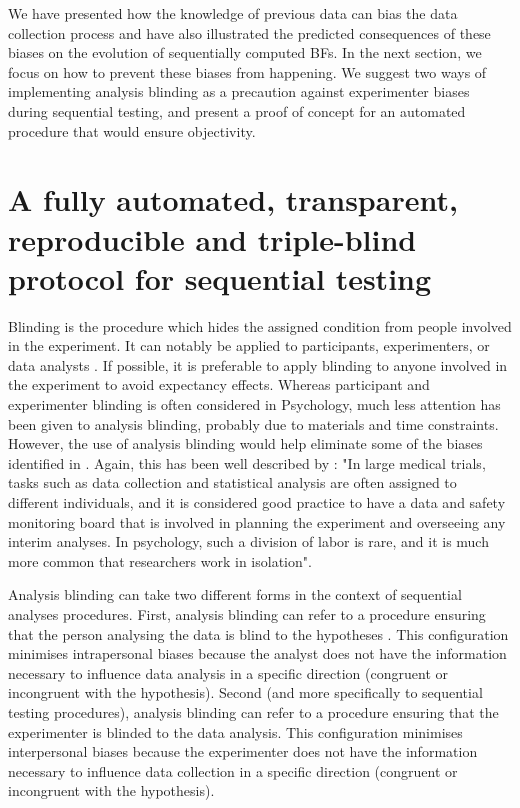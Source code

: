 \documentclass[a4paper,jou,natbib,floatsintext,donotrepeattitle]{apa6}
\begin{document}

We have presented how the knowledge of previous data can bias the data collection process and have also illustrated the predicted consequences of these biases on the evolution of sequentially computed BFs. In the next section, we focus on how to prevent these biases from happening. We suggest two ways of implementing analysis blinding as a precaution against experimenter biases during sequential testing, and present a proof of concept for an automated procedure that would ensure objectivity.

\section{A fully automated, transparent, reproducible and triple-blind protocol for sequential testing}

Blinding is the procedure which hides the assigned condition from people involved in the experiment. It can notably be applied to participants, experimenters, or data analysts \citep{schulz_blinding_2002}. If possible, it is preferable to apply blinding to anyone involved in the experiment to avoid expectancy effects. Whereas participant and experimenter blinding is often considered in Psychology, much less attention has been given to analysis blinding, probably due to materials and time constraints. However, the use of analysis blinding would help eliminate some of the biases identified in \cite{wicherts_degrees_2016-1}. Again, this has been well described by \cite{lakens_performing_2014}: "In large medical trials, tasks such as data collection and statistical analysis are often assigned to different individuals, and it is considered good practice to have a data and safety monitoring board that is involved in planning the experiment and overseeing any interim analyses. In psychology, such a division of labor is rare, and it is much more common that researchers work in isolation".

Analysis blinding can take two different forms in the context of sequential analyses procedures. First, analysis blinding can refer to a procedure ensuring that the person analysing the data is blind to the hypotheses \citep{miller_blind_2011}. This configuration minimises intrapersonal biases because the analyst does not have the information necessary to influence data analysis in a specific direction (congruent or incongruent with the hypothesis). Second (and more specifically to sequential testing procedures), analysis blinding can refer to a procedure ensuring that the experimenter is blinded to the data analysis. This configuration minimises interpersonal biases because the experimenter does not have the information necessary to influence data collection in a specific direction (congruent or incongruent with the hypothesis).
\end{document}
